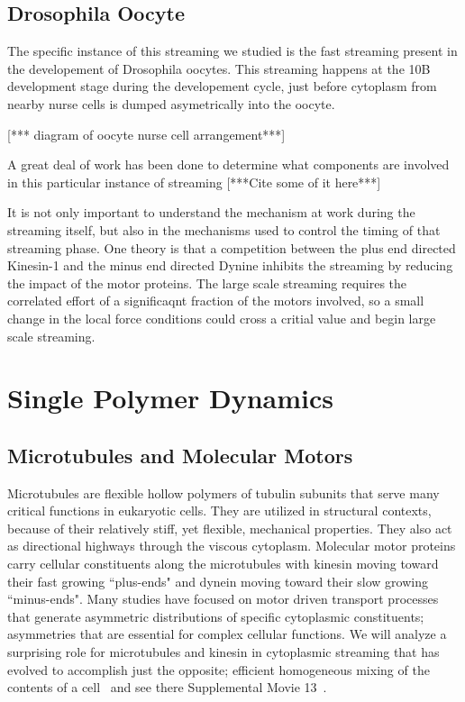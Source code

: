 \documentclass[11pt]{ucthesis}
\begin{document}
\section{Drosophila Oocyte}
The specific instance of this streaming we studied is the fast streaming present in the developement of Drosophila oocytes. This streaming happens at the 10B development stage during the developement cycle, just before cytoplasm from nearby nurse cells is dumped asymetrically into the oocyte.

[*** diagram of oocyte nurse cell arrangement***]

A great deal of work has been done to determine what components are involved in this particular instance of streaming [***Cite some of it here***]

It is not only important to understand the mechanism at work during the streaming itself, but also in the mechanisms used to control the timing of that streaming phase.
One theory is that a competition between the plus end directed Kinesin-1 and the minus end directed Dynine inhibits the streaming by reducing the impact of the motor proteins.
The large scale streaming requires the correlated effort of a significaqnt fraction of the motors involved, so a small change in the local force conditions could cross a critial value and begin large scale streaming.


\chapter{Single Polymer Dynamics}

\section{Microtubules and Molecular Motors}

Microtubules are flexible hollow polymers of tubulin subunits that
serve many critical functions in eukaryotic cells. They are utilized
in structural contexts, because of their relatively stiff, yet flexible,
mechanical properties.  They also act as directional highways through the
viscous cytoplasm. Molecular motor proteins carry cellular constituents
along the microtubules with kinesin moving toward their fast growing
``plus-ends" and dynein moving toward their slow growing ``minus-ends".
Many studies have focused on motor driven transport processes that
generate asymmetric distributions of specific cytoplasmic constituents;
asymmetries that are essential for complex cellular functions. 
We will analyze a surprising role for microtubules and kinesin in cytoplasmic streaming that has evolved to accomplish just the opposite; efficient homogeneous mixing of the contents of a cell~\cite{SerbusSaxton} and see there Supplemental Movie 13~\cite{Movie13}.
\end{document}
